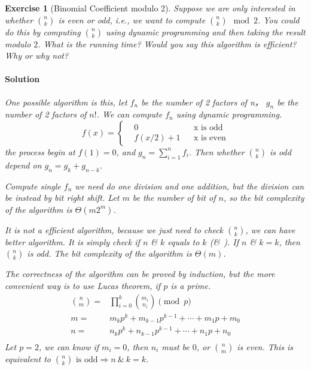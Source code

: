 \documentclass[12pt,a4]{article}
\newtheorem{exercise}[theorem]{Exercise}
\begin{document}
\begin{exercise}[Binomial Coefficient modulo 2]
  Suppose we are only interested in whether ${n \choose k}$ is even or odd,
  i.e., we want to compute ${n \choose k}  \mod 2$. You could do this by computing 
  ${n \choose k}$ using dynamic programming and then taking
  the result modulo $2$. What is the running time? Would you say this algorithm
  is efficient? Why or why not?
  
   \paragraph{Solution}
  One possible algorithm is this, let $f_n$ be the number of 2 factors of n， 
  $g_n$  be the number of 2 factors of $n!$. 
  We can compute $f_n$ using dynamic programming. 
  \begin{equation*}
  f(x)=\left\{
      \begin{aligned}
        &0  && \text{x~is~odd}\\
        &f(x / 2) + 1 && \text{x~is~even}
    \end{aligned}
  \right.
  \end{equation*}
  the process begin at $f(1) = 0$, and $g_n=\sum_{i=1}^nf_i$. Then whether 
  ${n \choose k}$ is odd depend on $g_n=g_k+g_{n-k}$.
  
  Compute single $f_n$ we need do one division and one addition, but the division can 
  be instead by bit right shift. Let $m$ be the number of bit of $n$, 
  so the bit complexity of the algorithm is $\Theta(m2^m)$.

  It is not a efficient algorithm, because we just need to check 
  $n \choose k$, we can have better algorithm. It is simply check if $n$ \& $k$ equals
  to $k$ (\&~). If $n$ \& $k = k$, then $n \choose k$ is odd. The
  bit complexity of the algorithm is $\Theta(m)$.

  The correctness of the algorithm can be proved by induction, but the more convenient way
   is to use Lucas theorem, if $p$ is a prime.
   $$
   \begin{aligned}
     \binom{n}{m}=&\prod_{i=0}^k\binom{m_i}{n_i}\pmod p\\
     m =& m_kp^k+m_{k-1}p^{k-1}+\cdots+m_1p+m_0\\
     n =& n_kp^k+n_{k-1}p^{k-1}+\cdots+n_1p+n_0\\
   \end{aligned}  
   $$
   Let $p=2$, we can know if $m_i = 0$, then $n_i$ must be $0$, or $\binom{n}{m}$ is even.
   This is equivalent to $\binom{n}{k} \text{ is odd} \Rightarrow n~\&~k = k$.

\end{exercise}
\end{document}
